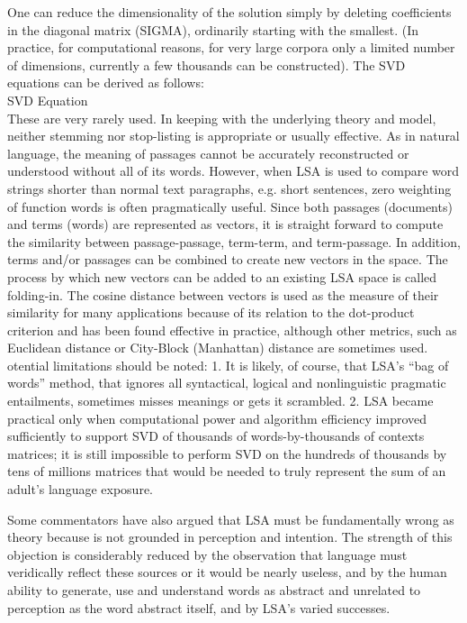 One can reduce the dimensionality of the solution simply by deleting coefficients in the diagonal matrix (SIGMA), ordinarily starting with the smallest. (In practice, for computational reasons, for very large corpora only a limited number of dimensions, currently a few thousands can be constructed). The SVD equations can be derived as follows:\\

SVD Equation \\

These are very rarely used. In keeping with the underlying theory and model, neither stemming nor stop-listing is appropriate or usually effective. As in natural language, the meaning of passages cannot be accurately reconstructed or understood without all of its words. However, when LSA is used to compare word strings shorter than normal text paragraphs, e.g. short sentences, zero weighting of function words is often pragmatically useful.
Since both passages (documents) and terms (words) are represented as vectors, it is straight forward to compute the similarity between passage-passage, term-term, and term-passage. In addition, terms and/or passages can be combined to create new vectors in the space. The process by which new vectors can be added to an existing LSA space is called folding-in. The cosine distance between vectors is used as the measure of their similarity for many applications because of its relation to the dot-product criterion and has been found effective in practice, although other metrics, such as Euclidean distance or City-Block (Manhattan) distance are sometimes used.
otential limitations should be noted:
1. It is likely, of course, that LSA's “bag of words” method, that ignores all syntactical, logical and nonlinguistic pragmatic entailments, sometimes misses meanings or gets it scrambled.
2. LSA became practical only when computational power and algorithm efficiency improved sufficiently to support SVD of thousands of words-by-thousands of contexts matrices; it is still impossible to perform SVD on the hundreds of thousands by tens of millions matrices that would be needed to truly represent the sum of an adult's language exposure.

Some commentators have also argued that LSA must be fundamentally wrong as theory because is not grounded in perception and intention. The strength of this objection is considerably reduced by the observation that language must veridically reflect these sources or it would be nearly useless, and by the human ability to generate, use and understand words as abstract and unrelated to perception as the word abstract itself, and by LSA’s varied successes.

